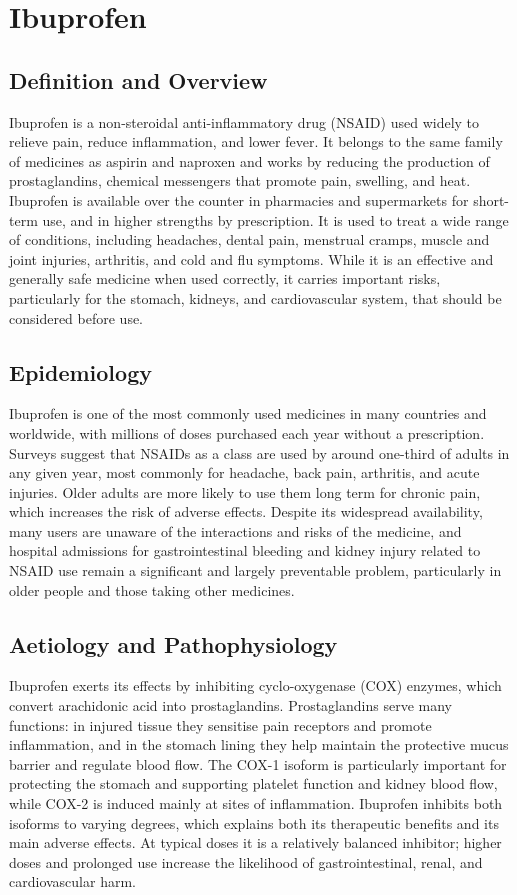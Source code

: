 \chapter{Ibuprofen}

\section*{Definition and Overview}
Ibuprofen is a non-steroidal anti-inflammatory drug (NSAID) used widely to relieve pain, reduce inflammation, and lower fever. It belongs to the same family of medicines as aspirin and naproxen and works by reducing the production of prostaglandins, chemical messengers that promote pain, swelling, and heat. Ibuprofen is available over the counter in pharmacies and supermarkets for short-term use, and in higher strengths by prescription. It is used to treat a wide range of conditions, including headaches, dental pain, menstrual cramps, muscle and joint injuries, arthritis, and cold and flu symptoms. While it is an effective and generally safe medicine when used correctly, it carries important risks, particularly for the stomach, kidneys, and cardiovascular system, that should be considered before use.

\section*{Epidemiology}
Ibuprofen is one of the most commonly used medicines in many countries and worldwide, with millions of doses purchased each year without a prescription. Surveys suggest that NSAIDs as a class are used by around one-third of adults in any given year, most commonly for headache, back pain, arthritis, and acute injuries. Older adults are more likely to use them long term for chronic pain, which increases the risk of adverse effects. Despite its widespread availability, many users are unaware of the interactions and risks of the medicine, and hospital admissions for gastrointestinal bleeding and kidney injury related to NSAID use remain a significant and largely preventable problem, particularly in older people and those taking other medicines.

\section*{Aetiology and Pathophysiology}
Ibuprofen exerts its effects by inhibiting cyclo-oxygenase (COX) enzymes, which convert arachidonic acid into prostaglandins. Prostaglandins serve many functions: in injured tissue they sensitise pain receptors and promote inflammation, and in the stomach lining they help maintain the protective mucus barrier and regulate blood flow. The COX-1 isoform is particularly important for protecting the stomach and supporting platelet function and kidney blood flow, while COX-2 is induced mainly at sites of inflammation. Ibuprofen inhibits both isoforms to varying degrees, which explains both its therapeutic benefits and its main adverse effects. At typical doses it is a relatively balanced inhibitor; higher doses and prolonged use increase the likelihood of gastrointestinal, renal, and cardiovascular harm.

